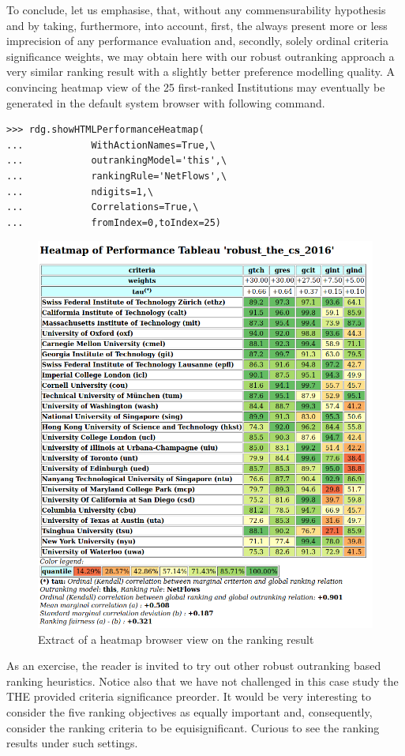 To conclude, let us emphasise, that, without any commensurability hypothesis and by taking, furthermore, into account, first, the always present more or less imprecision of any performance evaluation and, secondly, solely ordinal criteria significance weights, we may obtain here with our robust outranking approach a very similar ranking result with a slightly better preference modelling quality. A convincing heatmap view of the 25 first-ranked Institutions may eventually be generated in the default system browser with following command.
\begin{lstlisting}
>>> rdg.showHTMLPerformanceHeatmap(
...            WithActionNames=True,\
...            outrankingModel='this',\
...            rankingRule='NetFlows',\
...            ndigits=1,\
...            Correlations=True,\
...            fromIndex=0,toIndex=25)
\end{lstlisting}
\begin{figure}[ht]
\includegraphics[width=\hsize]{Figures/13-4-theHeatmap.png}
\caption{Extract of a heatmap browser view on the \NetFlows ranking result}
\label{fig:13.4}       %
\end{figure}

As an exercise, the reader is invited to try out other robust outranking based ranking heuristics. Notice also that we have not challenged in this case study the THE provided criteria significance preorder. It would be very interesting to consider the five ranking objectives as equally important and, consequently, consider the ranking criteria to be equisignificant. Curious to see the ranking results under such settings.
 

%
%
